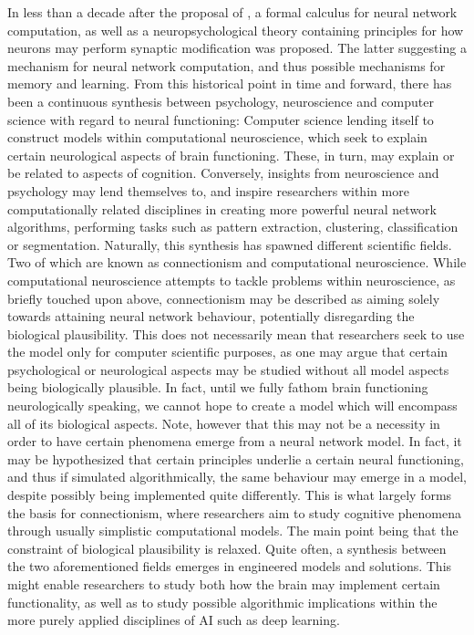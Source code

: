 In less than a decade after the proposal of \cite{McCulloch1943}, a formal calculus for neural network computation, as well as a neuropsychological theory containing principles for how neurons may perform synaptic modification was proposed. The latter suggesting a mechanism for neural network computation, and thus possible mechanisms for memory and learning. From this historical point in time and forward, there has been a continuous synthesis between psychology, neuroscience and computer science with regard to neural functioning: Computer science lending itself to construct models within computational neuroscience, which seek to explain certain neurological aspects of brain functioning. These, in turn, may explain or be related to aspects of cognition. Conversely, insights from neuroscience and psychology may lend themselves to, and inspire researchers within more computationally related disciplines in creating more powerful neural network algorithms, performing tasks such as pattern extraction, clustering, classification or segmentation. 
Naturally, this synthesis has spawned different scientific fields. Two of which are known as connectionism and computational neuroscience. While computational neuroscience attempts to tackle problems within neuroscience, as briefly touched upon above, connectionism may be described as aiming solely towards attaining neural network behaviour, potentially disregarding the biological plausibility. This does not necessarily mean that researchers seek to use the model only for computer scientific purposes, as one may argue that certain psychological or neurological aspects may be studied without all model aspects being biologically plausible. In fact, until we fully fathom brain functioning neurologically speaking, we cannot hope to create a model which will encompass all of its biological aspects. Note, however that this may not be a necessity in order to have certain phenomena emerge from a neural network model. In fact, it may be hypothesized that certain principles underlie a certain neural functioning, and thus if simulated algorithmically, the same behaviour may emerge in a model, despite possibly being implemented quite differently. This is what largely forms the basis for connectionism, where researchers aim to study cognitive phenomena through usually simplistic computational models. The main point being that the constraint of biological plausibility is relaxed.
Quite often, a synthesis between the two aforementioned fields emerges in engineered models and solutions. This might enable researchers to study both how the brain may implement certain functionality, as well as to study possible algorithmic implications within the more purely applied disciplines of AI such as deep learning.
\\

